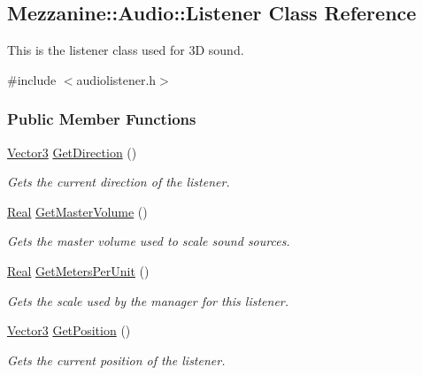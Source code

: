 \hypertarget{classMezzanine_1_1Audio_1_1Listener}{
\subsection{Mezzanine::Audio::Listener Class Reference}
\label{classMezzanine_1_1Audio_1_1Listener}
}


This is the listener class used for 3D sound.  




{\ttfamily \#include $<$audiolistener.h$>$}

\subsubsection*{Public Member Functions}
\begin{DoxyCompactItemize}
\item 
\hyperlink{classMezzanine_1_1Vector3}{Vector3} \hyperlink{classMezzanine_1_1Audio_1_1Listener_a62979c5c6eb31f2c98b5c8d56cece662}{GetDirection} ()
\begin{DoxyCompactList}\small\item\em Gets the current direction of the listener. \item\end{DoxyCompactList}\item 
\hyperlink{namespaceMezzanine_a726731b1a7df72bf3583e4a97282c6f6}{Real} \hyperlink{classMezzanine_1_1Audio_1_1Listener_a9eab36fdf62509af37a4b7cb7286e302}{GetMasterVolume} ()
\begin{DoxyCompactList}\small\item\em Gets the master volume used to scale sound sources. \item\end{DoxyCompactList}\item 
\hyperlink{namespaceMezzanine_a726731b1a7df72bf3583e4a97282c6f6}{Real} \hyperlink{classMezzanine_1_1Audio_1_1Listener_ad566d30003eb6e0b5e2bc86eed63636b}{GetMetersPerUnit} ()
\begin{DoxyCompactList}\small\item\em Gets the scale used by the manager for this listener. \item\end{DoxyCompactList}\item 
\hyperlink{classMezzanine_1_1Vector3}{Vector3} \hyperlink{classMezzanine_1_1Audio_1_1Listener_ac1a707dd38254dc1d84b82350ac37127}{GetPosition} ()
\begin{DoxyCompactList}\small\item\em Gets the current position of the listener. \item\end{DoxyCompactList}\item 

\end{DoxyCompactItemize}
